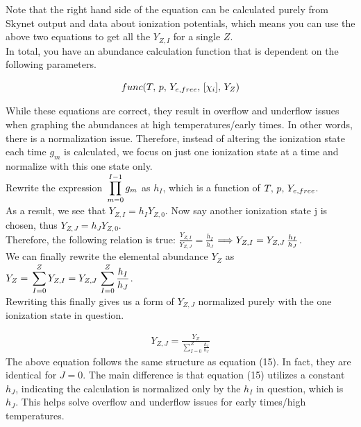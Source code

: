 \documentclass[11pt,a4paper]{article}
\begin{document}
Note that the right hand side of the equation can be calculated purely from Skynet output and data about ionization potentials, which means you can use the above two equations to get all the $Y_{Z,I}$ for a single $Z$. 
\\
In total, you have an abundance calculation function that is dependent on the following parameters. 

$$func(T,\thinspace p,\thinspace Y_{e,free},\thinspace [\chi_i],\thinspace Y_Z)$$

While these equations are correct, they result in overflow and underflow issues when graphing the abundances at high temperatures/early times. In other words, there is a normalization issue. Therefore, instead of altering the ionization state each time $g_m$ is calculated, we focus on just one ionization state at a time and normalize with this one state only. \\

Rewrite the expression  $\thinspace \displaystyle \prod_{m=0}^{I - 1} g_m$ as $h_I$, which is a function of $T,\thinspace p,\thinspace Y_{e,free}$. \\

As a result, we see that $Y_{Z,I} = h_I  Y_{Z,0}$. Now say another ionization state j is chosen, thus $Y_{Z,J} = h_J  Y_{Z,0}$. \\

Therefore, the following relation is true:
$\frac{Y_{Z,I}}{Y_{Z,J}} = \frac{h_I}{h_J} $ $\Longrightarrow
Y_{Z,I} = Y_{Z,J}\thinspace \frac{h_I}{h_J}$. \\

We can finally rewrite the elemental abundance $Y_Z$ as $Y_Z =\thinspace \displaystyle \sum_{I=0}^{Z} Y_{Z,I} = Y_{Z,J}\thinspace \displaystyle \sum_{I=0}^{Z} \frac{h_I}{h_J} $.\\

Rewriting this finally gives us a form of $Y_{Z,J}$ normalized purely with the one ionization state in question. 

\begin{align}
Y_{Z,J} = \frac{Y_Z}{\displaystyle \sum_{I=0}^{Z} \frac{h_I}{h_J}}
\end{align} 
The above equation follows the same structure as equation (15). In fact, they are identical for $J=$0. The main difference is that equation (15) utilizes a constant $h_J$, indicating the calculation is normalized only by the $h_I$ in question, which is $h_J$. This helps solve overflow and underflow issues for early times/high temperatures. \\
\end{document}
